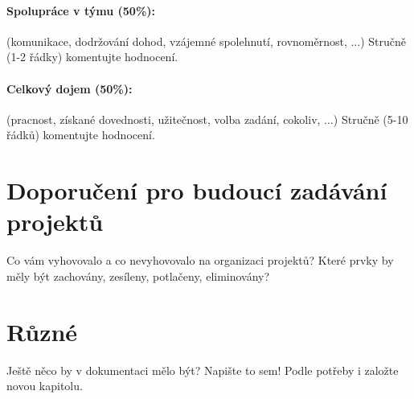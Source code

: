 \documentclass[11pt,a4paper]{article}
\begin{document}
\paragraph{Spolupráce v týmu (50\%):} (komunikace, dodržování dohod, vzájemné
spolehnutí, rovnoměrnost, $\ldots$)
Stručně (1-2 řádky) komentujte hodnocení. 

\paragraph{Celkový dojem (50\%):} (pracnost, získané dovednosti, užitečnost,
volba zadání, cokoliv, $\ldots$)
Stručně (5-10 řádků) komentujte hodnocení. 

\section{Doporučení pro budoucí zadávání projektů}

Co vám vyhovovalo a co nevyhovovalo na organizaci projektů? Které prvky by měly
být zachovány, zesíleny, potlačeny, eliminovány?

\section{Různé}

Ještě něco by v dokumentaci mělo být? Napište to sem! Podle potřeby i založte
novou kapitolu.
\end{document}
